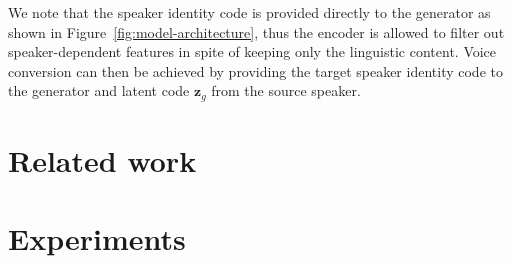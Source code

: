 \documentclass{article}
\begin{document}
We note that the speaker identity code is provided directly to the generator as shown in Figure~\ref{fig:model-architecture}, thus the encoder is allowed to filter out speaker-dependent features in spite of keeping only the linguistic content. Voice conversion can then be achieved by providing the target speaker identity code to the generator and latent code $\mathbf{z}_g$ from the source speaker.


\section{Related work}


\section{Experiments}
\label{sec:expts}


\end{document}
